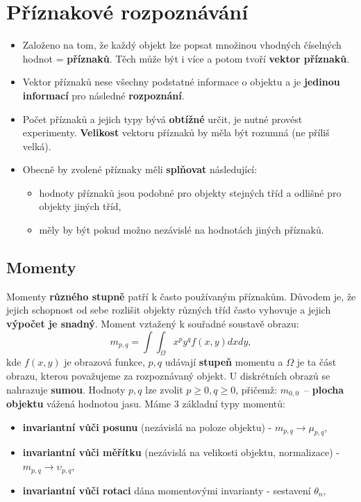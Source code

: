 \section{Příznakové rozpoznávání}
\begin{itemize}
    \item Založeno na tom, že každý objekt lze popsat množinou vhodných číselných hodnot = \textbf{příznaků}. Těch může být i více a potom tvoří \textbf{vektor příznaků}.
    \item Vektor příznaků nese všechny podstatné informace o objektu a je\textbf{ jedinou informací} pro následné \textbf{rozpoznání}.
    \item Počet příznaků a jejich typy bývá \textbf{obtížné} určit, je nutné provést experimenty. \textbf{Velikost} vektoru příznaků by měla být rozumná (ne příliš velká).
    \item Obecně by zvolené příznaky měli \textbf{splňovat} následující:
          \begin{itemize}
              \item hodnoty příznaků jsou podobné pro objekty stejných tříd a odlišné pro objekty jiných tříd,
              \item měly by být pokud možno nezávislé na hodnotách jiných příznaků.
          \end{itemize}
\end{itemize}

\subsection{Momenty}
Momenty \textbf{různého stupně} patří k často používaným příznakům. Důvodem je, že jejich schopnost od sebe rozlišit objekty různých tříd často vyhovuje a jejich \textbf{výpočet je snadný}. Moment vztažený k souřadné soustavě obrazu:
\begin{equation*}
    m_{p, q} = \int{}\int_\Omega x^p y ^q f(x, y)dx dy,
\end{equation*}
kde $f(x, y)$ je obrazová funkce, $p, q$ udávají \textbf{stupeň} momentu a $\Omega$ je ta část obrazu, kterou považujeme za rozpoznávaný objekt. U diskrétních obrazů se nahrazuje \textbf{sumou}. Hodnoty $p, q$ lze zvolit $p \geq 0, q \geq 0$, přičemž: $m_{0,0}$ -- \textbf{plocha objektu} vážená hodnotou jasu. Máme 3 základní typy momentů:
\begin{itemize}
    \item \textbf{invariantní vůči posunu} (nezávislá na poloze objektu) - $m_{p, q} \rightarrow \mu_{p, q}$,
    \item \textbf{invariantní vůči měřítku} (nezávislá na velikosti objektu, normalizace) - $m_{p, q} \rightarrow \upsilon_{p, q}$,
    \item \textbf{invariantní vůči rotaci} dána momentovými invarianty - sestavení $\theta_n$,
\end{itemize}

